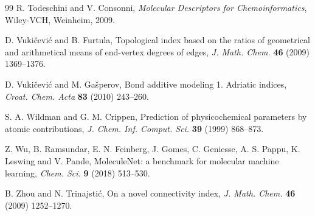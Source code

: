 \documentclass[11pt,a4paper]{article}
\theoremstyle{plain}
\theoremstyle{definition}
\theoremstyle{remark}
\begin{document}
\begin{thebibliography}{99}
R. Todeschini and V. Consonni, \emph{Molecular Descriptors for
Chemoinformatics}, Wiley-VCH, Weinheim, 2009.

D. Vuki\v{c}evi\'c and B. Furtula, Topological index based on the ratios of
geometrical and arithmetical means of end-vertex degrees of edges,
\emph{J. Math. Chem.} \textbf{46} (2009) 1369--1376.

D. Vuki\v{c}evi\'c and M. Ga\v{s}perov, Bond additive modeling 1. Adriatic
indices, \emph{Croat. Chem. Acta} \textbf{83} (2010) 243--260.

S. A. Wildman and G. M. Crippen, Prediction of physicochemical parameters by
atomic contributions, \emph{J. Chem. Inf. Comput. Sci.} \textbf{39} (1999)
868--873.

Z. Wu, B. Ramsundar, E. N. Feinberg, J. Gomes, C. Geniesse, A. S. Pappu,
K. Leswing and V. Pande, MoleculeNet: a benchmark for molecular machine learning,
\emph{Chem. Sci.} \textbf{9} (2018) 513--530.

B. Zhou and N. Trinajsti\'c, On a novel connectivity index,
\emph{J. Math. Chem.} \textbf{46} (2009) 1252--1270.

\end{thebibliography}
\end{document}

